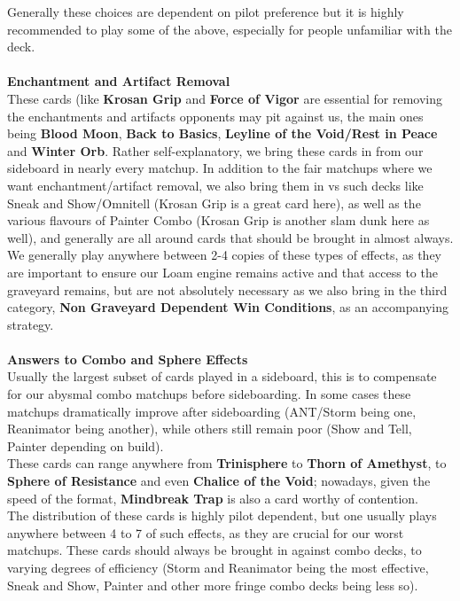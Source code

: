 \documentclass{report}
\begin{document}
Generally these choices are dependent on pilot preference but it is highly recommended to play some of the above, especially for people unfamiliar with the deck.\\\\
\textbf{Enchantment and Artifact Removal}\\
These cards (like \textbf{Krosan Grip} and \textbf{Force of Vigor} are essential for removing the enchantments and artifacts opponents may pit against us, the main ones being \textbf{Blood Moon}, \textbf{Back to Basics}, \textbf{Leyline of the Void/Rest in Peace} and \textbf{Winter Orb}.
Rather self-explanatory, we bring these cards in from our sideboard in nearly every matchup. In addition to the fair matchups where we want enchantment/artifact removal, we also bring them in vs such decks like Sneak and Show/Omnitell (Krosan Grip is a great card here), as well as the various flavours of Painter Combo (Krosan Grip is another slam dunk here as well), and generally are all around cards that should be brought in almost always. We generally play anywhere between 2-4 copies of these types of effects, as they are important to ensure our Loam engine remains active and that access to the graveyard remains, but are not absolutely necessary as we also bring in the third category, \textbf{Non Graveyard Dependent Win Conditions}, as an accompanying strategy.\\\\
\textbf{Answers to Combo and Sphere Effects}\\
Usually the largest subset of cards played in a sideboard, this is to compensate for our abysmal combo matchups before sideboarding. In some cases these matchups dramatically improve after sideboarding (ANT/Storm being one, Reanimator being another), while others still remain poor (Show and Tell, Painter depending on build).\\
These cards can range anywhere from \textbf{Trinisphere} to \textbf{Thorn of Amethyst}, to \textbf{Sphere of Resistance} and even \textbf{Chalice of the Void}; nowadays, given the speed of the format, \textbf{Mindbreak Trap} is also a card worthy of contention.\\ The distribution of these cards is highly pilot dependent, but one usually plays anywhere between 4 to 7 of such effects, as they are crucial for our worst matchups. These cards should always be brought in against combo decks, to varying degrees of efficiency (Storm and Reanimator being the most effective, Sneak and Show, Painter and other more fringe combo decks being less so).\\\\
\end{document}

